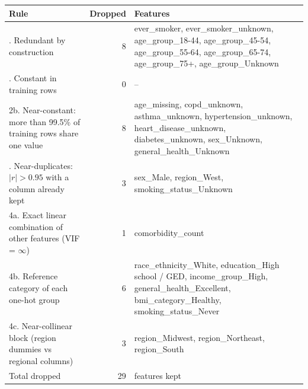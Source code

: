 \begin{tabularx}{\textwidth}{>{\raggedright\arraybackslash}p{5.2cm} r >{\raggedright\arraybackslash}X}
\toprule
Rule & Dropped & Features \\
\midrule
1. Redundant by construction & 8 & ever\_smoker, ever\_smoker\_unknown, age\_group\_18-44, age\_group\_45-54, age\_group\_55-64, age\_group\_65-74, age\_group\_75+, age\_group\_Unknown \\
2. Constant in training rows & 0 & -- \\
2b. Near-constant: more than 99.5\% of training rows share one value & 8 & age\_missing, copd\_unknown, asthma\_unknown, hypertension\_unknown, heart\_disease\_unknown, diabetes\_unknown, sex\_Unknown, general\_health\_Unknown \\
3. Near-duplicates: $|r| > 0.95$ with a column already kept & 3 & sex\_Male, region\_West, smoking\_status\_Unknown \\
4a. Exact linear combination of other features (VIF = $\infty$) & 1 & comorbidity\_count \\
4b. Reference category of each one-hot group & 6 & race\_ethnicity\_White, education\_High school / GED, income\_group\_High, general\_health\_Excellent, bmi\_category\_Healthy, smoking\_status\_Never \\
4c. Near-collinear block (region dummies vs regional columns) & 3 & region\_Midwest, region\_Northeast, region\_South \\
\midrule
Total dropped & 29 & 38 features kept \\
\bottomrule
\end{tabularx}
